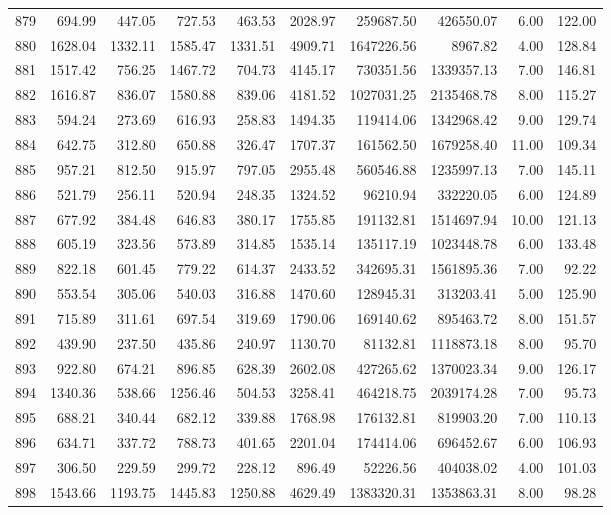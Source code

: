 \begin{tabular}{lrrrrrrrrr}
879 & 694.99 & 447.05 & 727.53 & 463.53 & 2028.97 & 259687.50 & 426550.07 & 6.00 & 122.00 \\
880 & 1628.04 & 1332.11 & 1585.47 & 1331.51 & 4909.71 & 1647226.56 & 8967.82 & 4.00 & 128.84 \\
881 & 1517.42 & 756.25 & 1467.72 & 704.73 & 4145.17 & 730351.56 & 1339357.13 & 7.00 & 146.81 \\
882 & 1616.87 & 836.07 & 1580.88 & 839.06 & 4181.52 & 1027031.25 & 2135468.78 & 8.00 & 115.27 \\
883 & 594.24 & 273.69 & 616.93 & 258.83 & 1494.35 & 119414.06 & 1342968.42 & 9.00 & 129.74 \\
884 & 642.75 & 312.80 & 650.88 & 326.47 & 1707.37 & 161562.50 & 1679258.40 & 11.00 & 109.34 \\
885 & 957.21 & 812.50 & 915.97 & 797.05 & 2955.48 & 560546.88 & 1235997.13 & 7.00 & 145.11 \\
886 & 521.79 & 256.11 & 520.94 & 248.35 & 1324.52 & 96210.94 & 332220.05 & 6.00 & 124.89 \\
887 & 677.92 & 384.48 & 646.83 & 380.17 & 1755.85 & 191132.81 & 1514697.94 & 10.00 & 121.13 \\
888 & 605.19 & 323.56 & 573.89 & 314.85 & 1535.14 & 135117.19 & 1023448.78 & 6.00 & 133.48 \\
889 & 822.18 & 601.45 & 779.22 & 614.37 & 2433.52 & 342695.31 & 1561895.36 & 7.00 & 92.22 \\
890 & 553.54 & 305.06 & 540.03 & 316.88 & 1470.60 & 128945.31 & 313203.41 & 5.00 & 125.90 \\
891 & 715.89 & 311.61 & 697.54 & 319.69 & 1790.06 & 169140.62 & 895463.72 & 8.00 & 151.57 \\
892 & 439.90 & 237.50 & 435.86 & 240.97 & 1130.70 & 81132.81 & 1118873.18 & 8.00 & 95.70 \\
893 & 922.80 & 674.21 & 896.85 & 628.39 & 2602.08 & 427265.62 & 1370023.34 & 9.00 & 126.17 \\
894 & 1340.36 & 538.66 & 1256.46 & 504.53 & 3258.41 & 464218.75 & 2039174.28 & 7.00 & 95.73 \\
895 & 688.21 & 340.44 & 682.12 & 339.88 & 1768.98 & 176132.81 & 819903.20 & 7.00 & 110.13 \\
896 & 634.71 & 337.72 & 788.73 & 401.65 & 2201.04 & 174414.06 & 696452.67 & 6.00 & 106.93 \\
897 & 306.50 & 229.59 & 299.72 & 228.12 & 896.49 & 52226.56 & 404038.02 & 4.00 & 101.03 \\
898 & 1543.66 & 1193.75 & 1445.83 & 1250.88 & 4629.49 & 1383320.31 & 1353863.31 & 8.00 & 98.28 \\

\end{tabular}

